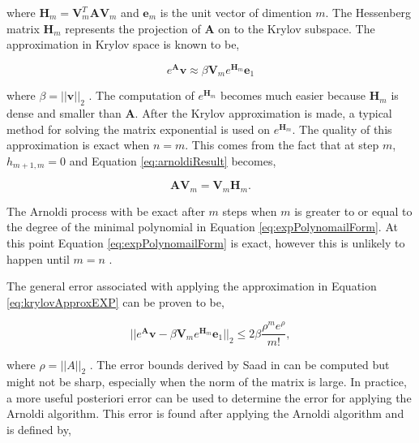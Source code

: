 \noindent where $\boldsymbol{H}_{m} = \boldsymbol{V}^{T}_{m}\boldsymbol{A}\boldsymbol{V}_{m}$ and $\boldsymbol{e}_{m}$ is the unit vector of dimention $m$. The Hessenberg matrix $\boldsymbol{H}_{m}$ represents the projection of $\boldsymbol{A}$ on to the Krylov subspace. The approximation in Krylov space is known to be, 

\begin{equation}
    e^{\boldsymbol{A}}\boldsymbol{v} \approx \beta \boldsymbol{V}_{m}e^{\boldsymbol{H}_{m}}\boldsymbol{e}_{1}
    \label{eq:krylovApproxEXP}
\end{equation}

\noindent where $\beta = ||\boldsymbol{v}||_{2}$ \cite{saad1989}. The computation of $e^{
\boldsymbol{H}_{m}}$ becomes much easier because $\boldsymbol{H}_{m}$ is dense and smaller than $\boldsymbol{A}$. After the Krylov approximation is made, a typical method for solving the matrix exponential is used on $e^{\boldsymbol{H}_{m}}$. The quality of this approximation is exact when $n = m$. This comes from the fact that at step $m$, $h_{m+1,m} = 0$ and Equation \ref{eq:arnoldiResult} becomes,

\begin{equation}
    \boldsymbol{A}\boldsymbol{V}_{m} = \boldsymbol{V}_{m}\boldsymbol{H}_{m}.
\end{equation}

\noindent The Arnoldi process with be exact after $m$ steps when $m$ is greater to or equal to the degree of the minimal polynomial in Equation \ref{eq:expPolynomailForm}. At this point Equation \ref{eq:expPolynomailForm} is exact, however this is unlikely to happen until $m=n$ \cite{saad1992} \cite{saad1989}. 

 The general error associated with applying the approximation in Equation \ref{eq:krylovApproxEXP} can be proven to be,
 
 \begin{equation}
     ||e^{\boldsymbol{A}}\boldsymbol{v} - \beta \boldsymbol{V}_{m}e^{\boldsymbol{H}_{m}}\boldsymbol{e}_{1}||_{2} \leq 2\beta \frac{\rho^{m}e^{\rho}}{m!},
 \end{equation}
 
 \noindent where $\rho = ||A||_{2}$ \cite{saad1992}. The error bounds derived by Saad in \cite{saad1992} can be computed but might not be sharp, especially when the norm of the matrix is large. In practice, a more useful posteriori error can be used to determine the error for applying the Arnoldi algorithm. This error is found after applying the Arnoldi algorithm and is defined by,
 
